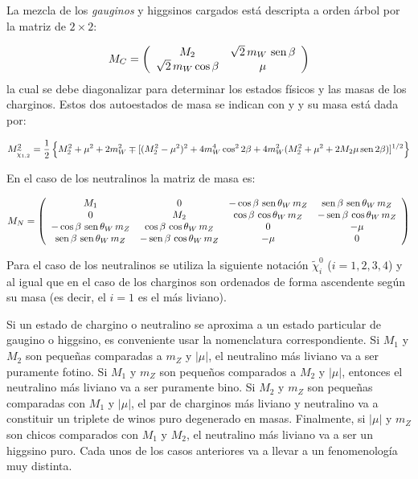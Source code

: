 \begin{itemize}
La mezcla de los \emph{gauginos} y higgsinos cargados está descripta a orden árbol por la matriz de $2\times 2$:

\begin{equation}
  M_{C} = \left(
  \begin{array}{cc}
      M_2               & {\sqrt{2}} \, m_{W} \, \operatorname{sen} \beta  \\
      \sqrt{2} \, m_W \cos \beta  & \mu
  \end{array}
  \right)
\end{equation}
%
la cual se debe diagonalizar para determinar los estados físicos y las masas de los charginos.
Estos dos autoestados de masa se indican con {\chinoonepm} y
{\chinotwopm} y su masa está dada por:

\begin{equation}
  M^2_{\widetilde{\chi}_{1,2}} = \frac{1}{2} \left\{ M_2^2 + \mu^2 + 2 m_W^2 \mp
  [(M_2^2-\mu^2)^2 + 4 m_W^4 \cos^2 2\beta + 4 m_W^2 (M_2^2+\mu^2 + 2 M_2 \mu \operatorname{sen}
    2\beta)]^{1/2} \right\}
\end{equation}


En el caso de los neutralinos la matriz de masa es:

\begin{equation}
  M_{N} = \left(
  \begin{array}{cccc}
    M_1 & 0 & - \cos\beta \, \operatorname{sen}\theta_W \, m_Z & \operatorname{sen}\beta \, \operatorname{sen}\theta_W \, m_Z \\
    0 & M_2 & \cos\beta \, \cos\theta_W \, m_Z & -\operatorname{sen}\beta \, \cos\theta_W \, m_Z \\
    - \cos\beta \, \operatorname{sen}\theta_W \, m_Z & \cos\beta \, \cos\theta_W  \,m_Z & 0 & -\mu \\
    \operatorname{sen}\beta \, \operatorname{sen}\theta_W \, m_Z & -\operatorname{sen}\beta \, \cos\theta_W \, m_Z & -\mu & 0 \\
  \end{array}
  \right)
\end{equation}

Para el caso de los neutralinos se utiliza la siguiente notación $\tilde{\chi}^0_{i}$ ($i=1,2,3,4$)
y al igual que en el caso de los charginos son ordenados de forma ascendente según su masa (es decir,
el $i=1$ es el más liviano).

Si un estado de chargino o neutralino se aproxima a un estado particular de
gaugino o higgsino, es conveniente usar la nomenclatura correspondiente. Si
$M_1$ y $M_2$ son pequeñas comparadas a $m_Z$ y $|\mu|$, el neutralino más
liviano va a ser puramente fotino. Si $M_1$ y $m_Z$ son pequeños comparados a
$M_2$ y $|\mu|$, entonces el neutralino más liviano va a ser puramente bino. Si
$M_2$ y $m_Z$ son pequeñas comparadas con $M_1$ y $|\mu|$, el par de charginos
más liviano y neutralino va a constituir un triplete de winos puro degenerado en
masas. Finalmente, si $|\mu|$ y $m_Z$ son chicos comparados con $M_1$ y $M_2$,
el neutralino más liviano va a ser un higgsino puro. Cada unos de los casos
anteriores va a llevar a un fenomenología muy distinta.



\end{itemize}
